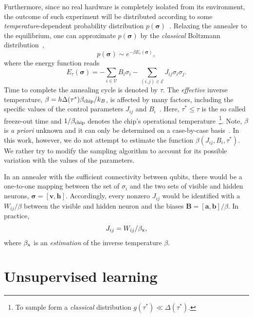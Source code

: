 \documentclass[aps,pra,showpacs,amsmath,amssymb,amsfonts,superscriptaddress,lengthcheck,longbibliography, twocolumn]{revtex4-1}
\newcommand{\bfm}{\boldsymbol}
\begin{document}
Furthermore, since no real hardware is completely isolated from its environment, the outcome of such experiment  will be 
distributed according to some \emph{temperature}-dependent probability distribution $p(\bfm \sigma)$~\cite{Yarkoni16}. 
%
Relaxing the annealer to the equilibrium, one can approximate $p(\bfm \sigma)$ by the \emph{classical} Boltzmann distribution~\cite{Benedetti17},
%
\begin{equation} 
\label{eq:drbm}
p(\bfm \sigma) \sim e^{ -\beta E_{\tau}(\bfm \sigma) },
\end{equation}
%
where the energy function reads
%
\begin{equation} 
\label{eq:Hf}
E_{\tau}(\bfm \sigma) = -\sum_{i\in\mathcal{V}}B_i\sigma_i-\sum_{(i,j)\in \mathcal{E}} J_{ij}\sigma_i\sigma_{j}.
\end{equation}
%
Time to complete the annealing cycle is denoted by $\tau$. The \emph{effective} inverse temperature,
$\beta = h\Delta(\tau^{*})\beta_{\rm chip}/k_B$,  is affected by many factors, including the specific values of the 
control parameters $J_{ij}$ and  $B_i$~\cite{Amin15}. Here, $\tau^*\le \tau$ is the so called freeze-out time and
$1/\beta_{\rm chip}$ denotes the chip's operational temperature~\footnote{To sample form a \emph{classical} 
distribution $g(\tau^*) \ll \Delta(\tau^*)$.}. 
Note,  $\beta $ is \emph{a priori} unknown and
it can only be determined on a case-by-case basis~\cite{Benedetti16}. In this work, however, we do not attempt 
to estimate the function $\beta(J_{ij},B_i,\tau^*)$. We rather try to modify the sampling algorithm to account for its 
possible variation with the values of the parameters. 
 
In an annealer with the sufficient connectivity between qubits, there would be a one-to-one mapping between the set of $\sigma_i$ and the two sets of visible 
and hidden neurons, $\bfm \sigma = [\bfm v, \bfm h]$. Accordingly, every nonzero $J_{ij}$ would be identified 
with a $W_{ij}/\beta$ between the visible and hidden neuron and the biases $\bfm B = [\bfm a, \bfm b]/\beta$. In practice,
%
\begin{equation}
J_{ij} = W_{ij} /\beta_{\rm x},
\end{equation}
%
where $\beta_{\rm x}$ is an \emph{estimation} of the inverse temperature $\beta$.
%
\section{Unsupervised learning} 
\end{document}
